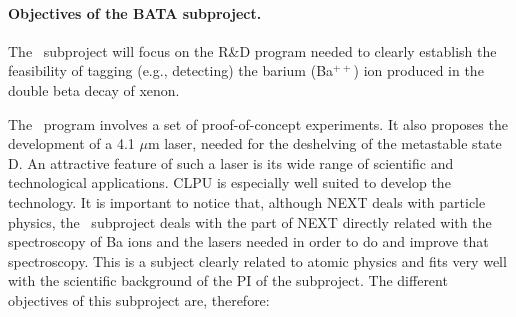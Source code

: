 \paragraph{Objectives of the BATA subproject.}

The \BATA\ subproject will focus on the R\&D program needed to clearly establish the feasibility of tagging (e.g., detecting) the barium (Ba$^{++}$) ion produced in the double beta decay of xenon. 

The \BATA\ program involves a set of proof-of-concept experiments. It also proposes the development of a 4.1 $\mu$m laser, needed for the deshelving of the metastable state D. An attractive feature of such a laser is its wide range of scientific and technological applications. CLPU is especially well suited to develop the technology. It is important to notice that, although NEXT deals with particle physics, the \BATA\ subproject deals with the part of NEXT directly related with the spectroscopy of Ba ions and the lasers needed in order to do and improve that spectroscopy. This is a subject clearly related to atomic physics and fits very well with the scientific background of the PI of the subproject. The different objectives of this subproject are, therefore:

